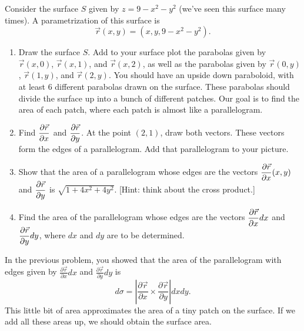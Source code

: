 \begin{problem}
 Consider the surface $S$ given by $z=9-x^2-y^2$ (we've seen this surface many times). A parametrization of this surface is $$\vec r(x,y) = (x,y,9-x^2-y^2).$$
\begin{enumerate}
 \item {}%
Draw the surface $S$. Add to your surface plot the parabolas given by $\vec r(x,0)$, $\vec r(x,1)$, and $\vec r(x,2)$, as well as the parabolas given by $\vec r(0,y)$, $\vec r(1,y)$, and $\vec r(2,y)$. You should have an upside down paraboloid, with at least 6 different parabolas drawn on the surface.  These parabolas should divide the surface up into a bunch of different patches. Our goal is to find the area of each patch, where each patch is almost like a parallelogram. 
 \item Find $\displaystyle \frac{\partial \vec r}{\partial x}$ and $\displaystyle\frac{\partial \vec r}{\partial y}$. At the point $(2,1)$, draw both vectors. These vectors form the edges of a parallelogram. Add that parallelogram to your picture.
 \item Show that the area of a parallelogram whose edges are the vectors $\displaystyle\frac{\partial \vec r}{\partial x}(x,y)$ and $\displaystyle\frac{\partial \vec r}{\partial y}$ is $\sqrt{1+4x^2+4y^2}$. [Hint: think about the cross product.]
 \item Find the area of the parallelogram whose edges are the vectors $\displaystyle\frac{\partial \vec r}{\partial x}dx$ and $\displaystyle\frac{\partial \vec r}{\partial y}dy$, where $dx$ and $dy$ are to be determined.
\end{enumerate}
\end{problem}

In the previous problem, you showed that the area of the parallelogram with edges given by $\frac{\partial \vec r}{\partial x}dx$ and $\frac{\partial \vec r}{\partial y}dy$ is $$d\sigma =\left |\frac{\partial \vec r}{\partial x} \times \frac{\partial \vec r}{\partial y}\right| dxdy.$$
This little bit of area approximates the area of a tiny patch on the surface.  If we add all these areas up, we should obtain the surface area.


